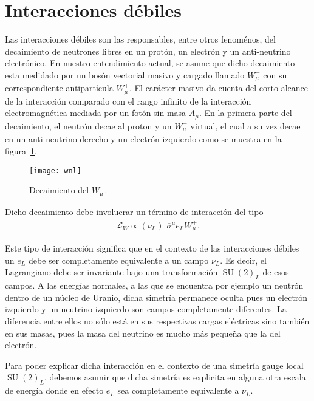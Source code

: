 \section{Interacciones débiles}
\begin{frame}
Las interacciones débiles son las responsables, entre otros fenoménos,
del decaimiento de neutrones libres en un protón, un electrón y un
anti-neutrino electrónico. En nuestro entendimiento actual, se asume
que dicho decaimiento esta medidado por un bosón vectorial masivo y
cargado llamado $W^-_{\mu}$ con su correspondiente antipartícula
$W^{+}_{\mu}$. El carácter masivo da cuenta del corto alcance de la
interacción comparado con el rango infinito de la
interacción electromagnética mediada por un fotón sin masa
$A_{\mu}$. En la primera parte del decaimiento, el neutrón decae al
proton y un $W^{-}_{\mu}$ virtual, el cual a su vez decae en un
anti-neutrino derecho y un electrón izquierdo como se muestra en la
figura~\ref{fig:wnl}.

\begin{figure}
  \centering
  \texttt{[image: wnl]}
  \caption{Decaimiento del $W_\mu^-$.}
  \label{fig:wnl}
\end{figure}

Dicho decaimiento debe involucrar un término de interacción del tipo
\begin{align}
  \mathcal{L}_{W}\propto \left( \nu_L \right)^{\dagger}\overline{\sigma}^{\mu} e_L W_{\mu}^{+}.
\end{align}



Este tipo de interacción significa que en el contexto de las interacciones débiles un $e_L$ debe ser completamente
equivalente a un campo $\nu_L$. Es decir, el Lagrangiano debe ser
invariante bajo una transformación $\operatorname{SU}(2)_L$ de esos campos. A las energías normales, a las que se encuentra por ejemplo un neutrón dentro de un núcleo de Uranio, dicha simetría permanece oculta pues un electrón izquierdo y un neutrino izquierdo son campos completamente diferentes.
La diferencia entre ellos no sólo está en sus respectivas cargas eléctricas sino también en sus
masas, pues la masa del neutrino es mucho más pequeña que la del electrón. 

Para poder explicar dicha interacción en el contexto de una simetría gauge local $\operatorname{SU}(2)_L$, debemos asumir que dicha simetría es explicita en alguna otra escala de energía donde en efecto  $e_L$ sea completamente
equivalente a $\nu_L$.


\end{frame}
